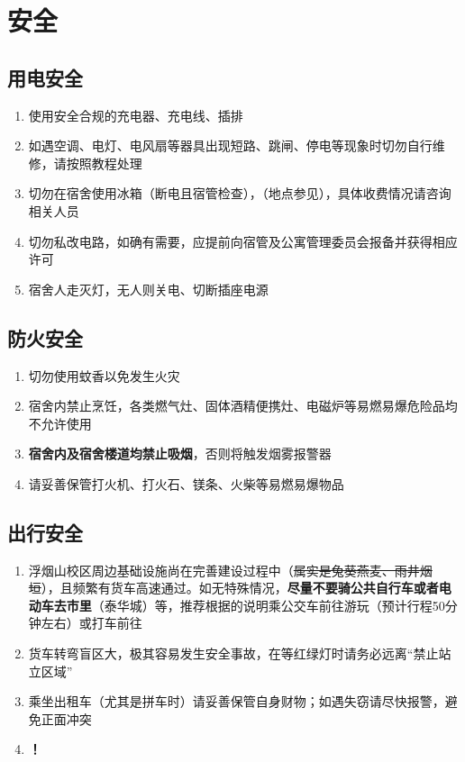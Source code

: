 \chapter[安全]{安全}

\section[用电安全]{用电安全}
\begin{enumerate}
    \item 使用安全合规的充电器、充电线、插排
    \item 如遇空调、电灯、电风扇等器具出现短路、跳闸、停电等现象时切勿自行维修，请按照教程处理
    \item 切勿在宿舍使用冰箱（断电且宿管检查），\textbf{}（地点参见），具体收费情况请咨询相关人员
    \item 切勿私改电路，如确有需要，应提前向宿管及公寓管理委员会\footnotemark 报备并获得相应许可
    \item 宿舍人走灭灯，无人则关电、切断插座电源
\end{enumerate}

\section[防火安全]{防火安全}
\begin{enumerate}
    \item 切勿使用蚊香以免发生火灾
    \item 宿舍内禁止烹饪，各类燃气灶、固体酒精便携灶、电磁炉等易燃易爆危险品均不允许使用
    \item \textbf{宿舍内及宿舍楼道均禁止吸烟}，否则将触发烟雾报警器
    \item 请妥善保管打火机、打火石、镁条、火柴等易燃易爆物品
\end{enumerate}

\section[出行安全]{出行安全}
\begin{enumerate}
    \item 浮烟山校区周边基础设施尚在完善建设过程中（\sout{属实是兔葵燕麦、雨井烟垣}），且频繁有货车高速通过。如无特殊情况，\textbf{尽量不要骑公共自行车或者电动车去市里}（泰华城）等，推荐根据的说明乘公交车前往游玩（预计行程50分钟左右）或打车前往
    \item 货车转弯盲区大，极其容易发生安全事故，在等红绿灯时请务必远离“禁止站立区域”
    \item 乘坐出租车（尤其是拼车时）请妥善保管自身财物；如遇失窃请尽快报警，避免正面冲突
    \item \textbf{！}
\end{enumerate}

